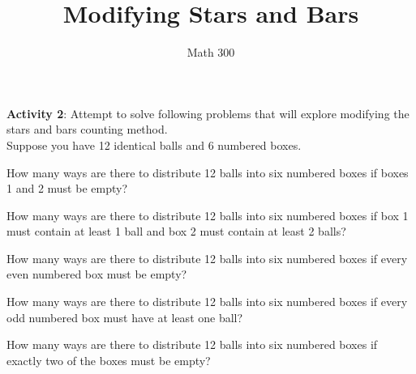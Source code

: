 \documentclass[11pt]{amsart}
\title{Modifying Stars and Bars}
\author{Math 300}
\newenvironment{packed_enum}{
\begin{enumerate}
  \setlength{\itemsep}{1pt}
  \setlength{\parskip}{0pt}
  \setlength{\parsep}{0pt}
}{\end{enumerate}}
\begin{document}
\maketitle


{\bf Activity 2}: Attempt to solve following problems that will explore modifying the stars and bars counting method.\\

Suppose you have 12 identical balls and 6 numbered boxes.

\begin{packed_enum}
\item How many ways are there to distribute 12 balls into six numbered boxes if boxes 1 and 2 must be empty?
\item How many ways are there to distribute 12 balls into six numbered boxes if box 1 must contain at least 1 ball and box 2 must contain at least 2 balls?
\item How many ways are there to distribute 12 balls into six numbered boxes if every even numbered box must be empty?
\item How many ways are there to distribute 12 balls into six numbered boxes if every odd numbered box must have at least one ball?
\item How many ways are there to distribute 12 balls into six numbered boxes if exactly two of the boxes must be empty?
\end{packed_enum}
\end{document}
